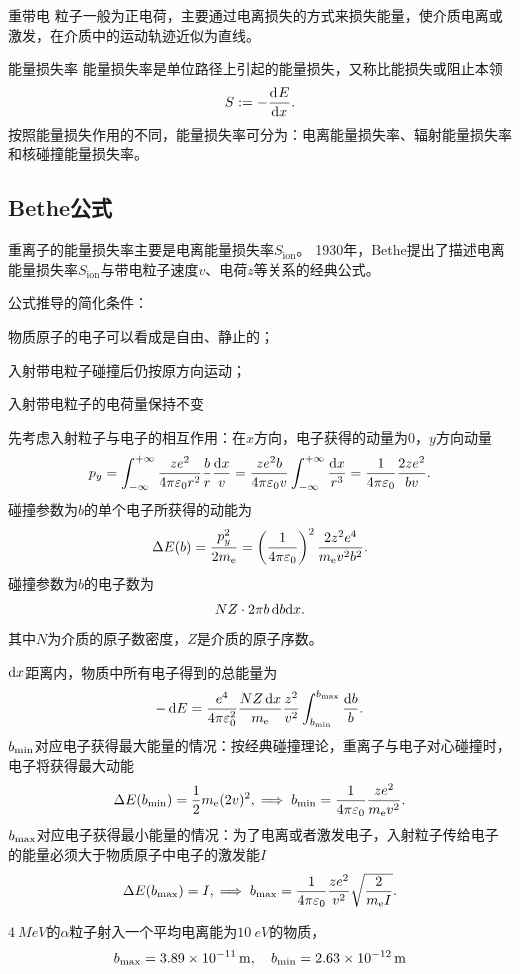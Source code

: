重带电 粒子一般为正电荷，主要通过电离损失的方式来损失能量，使介质电离或激发，在介质中的运动轨迹近似为直线。
\begin{definition}{能量损失率}{}
	能量损失率是单位路径上引起的能量损失，又称比能损失或阻止本领
	\begin{align}
		S:=-\frac{\mathrm{d}^{{}}E}{\mathrm{d}{x}^{{}}}.
	\end{align}
	按照能量损失作用的不同，能量损失率可分为：电离能量损失率、辐射能量损失率和核碰撞能量损失率。
\end{definition}

\subsection{Bethe公式}

重离子的能量损失率主要是电离能量损失率$S_{\mathrm{ion}}$。
1930年，Bethe提出了描述电离能量损失率$S_{\mathrm{ion}}$与带电粒子速度$v$、电荷$z$等关系的经典公式。

公式推导的简化条件：
\begin{compactenum}
	\item 物质原子的电子可以看成是自由、静止的；
	\item 入射带电粒子碰撞后仍按原方向运动；
	\item 入射带电粒子的电荷量保持不变
\end{compactenum}

先考虑入射粒子与电子的相互作用：在$x$方向，电子获得的动量为0，$y$方向动量 
\[
	p_y=\int_{-\infty}^{+\infty}\frac{ze^2}{4\pi\varepsilon_0r^2}\frac br\frac{\mathop{}\!\mathrm{d} x}v=\frac{ze^2b}{4\pi\varepsilon_0v}\int_{-\infty}^{+\infty}\frac{\mathop{}\!\mathrm{d} x}{r^3}=\frac1{4\pi\varepsilon_0}\frac{2ze^2}{bv}.
\]
碰撞参数为$b$的单个电子所获得的动能为
\[
	\Delta E(b)=\frac{p_y^2}{2m_\mathrm e}=\left(\frac1{4\pi\varepsilon_0}\right)^2\frac{2z^2e^4}{m_\mathrm e v^2b^2}.
\]
碰撞参数为$b$的电子数为
\[
	NZ\cdot 2\pi b\mathop{}\!\mathrm{d} b\mathrm{d} x.
\]
其中$N$为介质的原子数密度，$Z$是介质的原子序数。

$\mathop{}\!\mathrm{d} x$距离内，物质中所有电子得到的总能量为
\[
	-\mathop{}\!\mathrm{d} E=\frac{e^4}{4\pi\varepsilon_0^2}\frac{NZ\mathop{}\!\mathrm{d} x}{m_\mathrm e}\frac{z^2}{v^2}\int_{b_\mathrm{min}}^{b_\mathrm{max}}\frac{\mathop{}\!\mathrm{d} b}b.
\]
$b_\mathrm{min}$对应电子获得最大能量的情况：按经典碰撞理论，重离子与电子对心碰撞时，电子将获得最大动能
\[
	\Delta E(b_\mathrm{min})=\frac12m_\mathrm e(2v)^2,\implies b_\mathrm{min}=\frac1{4\pi\varepsilon_0}\frac{ze^2}{m_\mathrm e v^2}.
\]
$b_\mathrm{max}$对应电子获得最小能量的情况：为了电离或者激发电子，入射粒子传给电子的能量必须大于物质原子中电子的激发能$I$
\[
	\Delta E(b_\mathrm{max})=I,\implies b_\mathrm{max}=\frac1{4\pi\varepsilon_0}\frac{ze^2}{v^2}\sqrt{\frac2{m_\mathrm e I}}.
\]
\begin{example}{}{}
	$\SI{4}{MeV}$的$\alpha$粒子射入一个平均电离能为$\SI{10}{eV}$的物质，
	\[
		b_\mathrm{max}=\SI{3.89e-11}{m},\quad b_\mathrm{min}=\SI{2.63e-12}{m}
	\]
\end{example}


